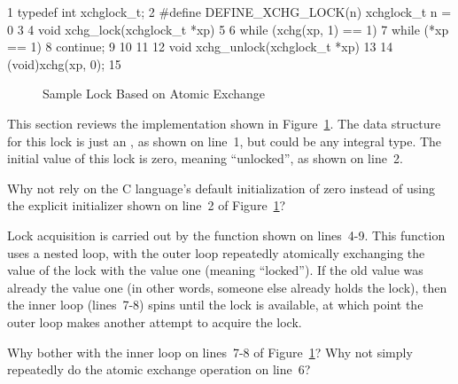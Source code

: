 { \scriptsize
\begin{verbbox}
  1 typedef int xchglock_t;
  2 #define DEFINE_XCHG_LOCK(n) xchglock_t n = 0
  3 
  4 void xchg_lock(xchglock_t *xp)
  5 {
  6   while (xchg(xp, 1) == 1) {
  7     while (*xp == 1)
  8       continue;
  9   }
 10 }
 11 
 12 void xchg_unlock(xchglock_t *xp)
 13 {
 14   (void)xchg(xp, 0);
 15 }
\end{verbbox}
}
\begin{figure}[tbp]
\centering
\theverbbox
\caption{Sample Lock Based on Atomic Exchange}
\label{fig:locking:Sample Lock Based on Atomic Exchange}
\end{figure}

This section reviews the implementation shown in
Figure~\ref{fig:locking:Sample Lock Based on Atomic Exchange}.
The data structure for this lock is just an , as shown on
line~1, but could be any integral type.
The initial value of this lock is zero, meaning ``unlocked'',
as shown on line~2.

\QuickQuiz{}
	Why not rely on the C language's default initialization of
	zero instead of using the explicit initializer shown on
	line~2 of
	Figure~\ref{fig:locking:Sample Lock Based on Atomic Exchange}?
 \QuickQuizEnd

Lock acquisition is carried out by the  function
shown on lines~4-9.
This function uses a nested loop, with the outer loop repeatedly
atomically exchanging the value of the lock with the value one
(meaning ``locked'').
If the old value was already the value one (in other words, someone
else already holds the lock), then the inner loop (lines~7-8)
spins until the lock is available, at which point the outer loop
makes another attempt to acquire the lock.

\QuickQuiz{}
	Why bother with the inner loop on lines~7-8 of
	Figure~\ref{fig:locking:Sample Lock Based on Atomic Exchange}?
	Why not simply repeatedly do the atomic exchange operation
	on line~6?
 \QuickQuizEnd

